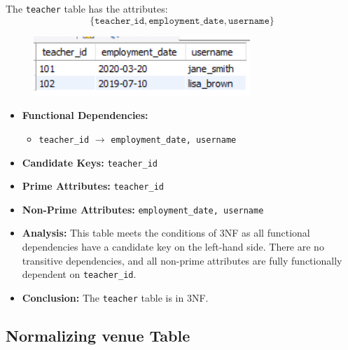 The \texttt{teacher} table has the attributes:
\[
\{ \texttt{teacher\_id}, \texttt{employment\_date}, \texttt{username} \}
\]
\begin{figure}
    [h]
    \centering
    \includegraphics{images/table_data/teacher_table.png}
\end{figure}
\begin{itemize}
    \item \textbf{Functional Dependencies:}
    \begin{itemize}
        \item \texttt{teacher\_id} $\rightarrow$ \texttt{employment\_date, username}
    \end{itemize}

    \item \textbf{Candidate Keys:} \texttt{teacher\_id}

    \item \textbf{Prime Attributes:} \texttt{teacher\_id}

    \item \textbf{Non-Prime Attributes:} \texttt{employment\_date, username}

    \item \textbf{Analysis:} This table meets the conditions of 3NF as all functional dependencies have a candidate key on the left-hand side. There are no transitive dependencies, and all non-prime attributes are fully functionally dependent on \texttt{teacher\_id}.

    \item \textbf{Conclusion:} The \texttt{teacher} table is in 3NF.
\end{itemize}

\subsection{Normalizing venue Table}

